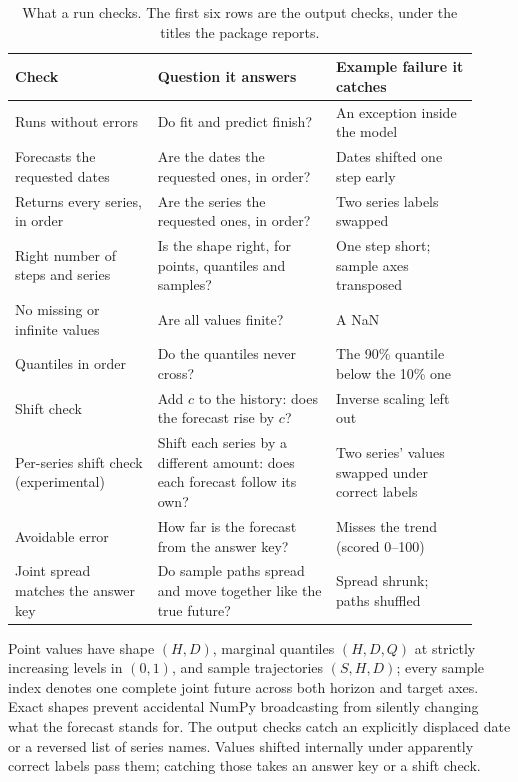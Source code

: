 \documentclass[11pt,a4paper]{article}
\begin{document}
\begin{table}[t]
\centering\small
\begin{tabular}{@{}>{\raggedright\arraybackslash}p{0.29\linewidth}>{\raggedright\arraybackslash}p{0.35\linewidth}>{\raggedright\arraybackslash}p{0.28\linewidth}@{}}
\toprule
Check & Question it answers & Example failure it catches \\
\midrule
Runs without errors & Do fit and predict finish? & An exception inside the model \\[0.3em]
Forecasts the requested dates & Are the dates the requested ones, in order? & Dates shifted one step early \\[0.3em]
Returns every series, in order & Are the series the requested ones, in order? & Two series labels swapped \\[0.3em]
Right number of steps and series & Is the shape right, for points, quantiles and samples? & One step short; sample axes transposed \\[0.3em]
No missing or infinite values & Are all values finite? & A NaN \\[0.3em]
Quantiles in order & Do the quantiles never cross? & The 90\% quantile below the 10\% one \\[0.3em]
Shift check & Add $c$ to the history: does the forecast rise by $c$? & Inverse scaling left out \\[0.3em]
Per-series shift check (experimental) & Shift each series by a different amount: does each forecast follow its own? & Two series' values swapped under correct labels \\[0.3em]
Avoidable error & How far is the forecast from the answer key? & Misses the trend (scored 0--100) \\[0.3em]
Joint spread matches the answer key & Do sample paths spread and move together like the true future? & Spread shrunk; paths shuffled \\
\bottomrule
\end{tabular}
\caption{What a run checks. The first six rows are the output checks,
under the titles the package reports.}
\label{tab:checks}
\end{table}

Point values have shape $(H,D)$, marginal quantiles $(H,D,Q)$ at strictly
increasing levels in $(0,1)$, and sample trajectories $(S,H,D)$; every
sample index denotes one complete joint future across both horizon and
target axes. Exact shapes prevent accidental NumPy broadcasting from
silently changing what the forecast stands for. The output checks catch
an explicitly displaced date or a reversed list of series names. Values
shifted internally under apparently correct labels pass them; catching
those takes an answer key or a shift check.
\end{document}
